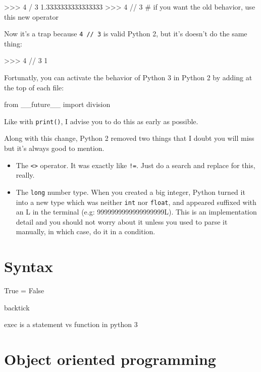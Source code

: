 \begin{py3}
>>> 4 / 3
1.3333333333333333
>>> 4 // 3  # if you want the old behavior, use this new operator
\end{py3}

Now it's a trap because \lstinline{4 // 3} is valid Python 2, but it's doesn't do the same thing:

\begin{py2}
>>> 4 // 3
1
\end{py2}

Fortunatly, you can activate the behavior of Python 3 in Python 2 by adding at the top of each file:

\begin{py2and3}
from __future__ import division
\end{py2and3}

Like with \lstinline{print()}, I advise you to do this as early as possible.

Along with this change, Python 2 removed two things that I doubt you will miss but it's always good to mention.

\begin{itemize}
    \item The \lstinline{<>} operator. It was exactly like \lstinline{!=}. Just do a search and replace for this, really.
    \item The \lstinline{long} number type. When you created a big integer, Python turned it into a new type which was neither \lstinline{int} nor \lstinline{float}, and appeared suffixed with an L in the terminal (e.g: 9999999999999999999L). This is an implementation detail and you should not worry about it unless you used to parse it manually, in which case, do it in a condition.
\end{itemize}


\section{Syntax}

True = False

backtick

exec is a statement vs function in python 3


\section{Object oriented programming}

